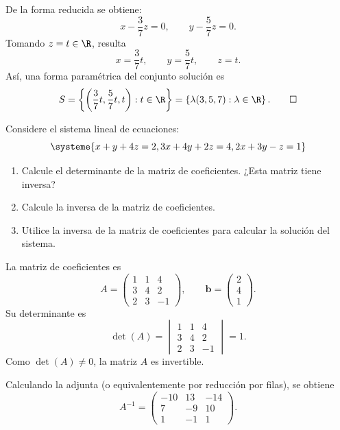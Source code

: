 \documentclass[12pt,a4]{aleph-examen}
\begin{document}
\begin{preguntas}
\begin{respuesta}
    De la forma reducida se obtiene:
    \[
        x-\frac{3}{7}z=0,
        \qquad
        y-\frac{5}{7}z=0.
    \]
    Tomando $z=t\in\R$, resulta
    \[
        x=\frac{3}{7}t,
        \qquad
        y=\frac{5}{7}t,
        \qquad
        z=t.
    \]
    Así, una forma paramétrica del conjunto solución es
    \[
        S=\left\{\left(\frac{3}{7}t,\frac{5}{7}t,t\right):t\in\R\right\}
        =\left\{\lambda(3,5,7):\lambda\in\R\right\}.\qedhere
    \]
\end{respuesta}

\item 
    Considere el sistema lineal de ecuaciones:
    \[
        \systeme{x+y+4 z=2, 3x+4y+2z=4, 2x+3y-z=1}
    \]
    \begin{enumerate}
        \item Calcule el determinante de la matriz de coeficientes. ¿Esta matriz tiene inversa?
        \item Calcule la inversa de la matriz de coeficientes.
        \item Utilice la inversa de la matriz de coeficientes para calcular la solución del sistema.
    \end{enumerate}

\begin{respuesta}
    La matriz de coeficientes es
    \[
        A=\begin{pmatrix}
            1 & 1 & 4\\
            3 & 4 & 2\\
            2 & 3 & -1
        \end{pmatrix},
        \qquad
        \mathbf{b}=\begin{pmatrix}2\\4\\1\end{pmatrix}.
    \]
    Su determinante es
    \[
        \det(A)=\begin{vmatrix}
            1 & 1 & 4\\
            3 & 4 & 2\\
            2 & 3 & -1
        \end{vmatrix}=1.
    \]
    Como $\det(A)\neq 0$, la matriz $A$ es invertible.

    Calculando la adjunta (o equivalentemente por reducción por filas), se obtiene
    \[
        A^{-1}=\begin{pmatrix}
            -10 & 13 & -14\\
            7 & -9 & 10\\
            1 & -1 & 1
        \end{pmatrix}.
    \]


\end{respuesta}
\end{preguntas}
\end{document}
